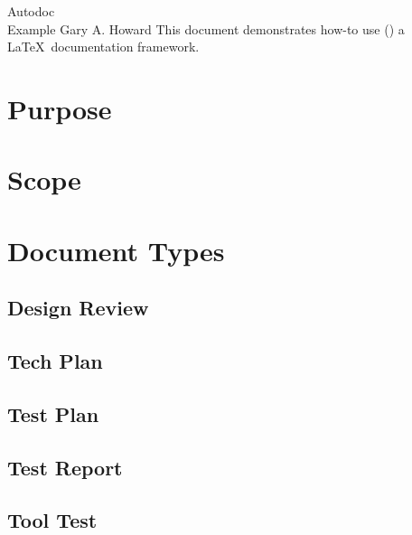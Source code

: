 \documentclass[10pt]{tlc-article}%
\begin{document}
%
  \tlcTitlePageAndTableOfContents%
    {Autodoc \\ Example}%
    {Gary A. Howard}%
    {This document demonstrates how-to use (\skAutoDoc) a \LaTeX\ documentation
     framework.}%
\section{Purpose}
%
\section{Scope}
%
\section{Document Types}
%
\subsection{Design Review}
%
\subsection{Tech Plan}
%
\subsection{Test Plan}
%
\subsection{Test Report}
%
\subsection{Tool Test}
%
\end{document}
